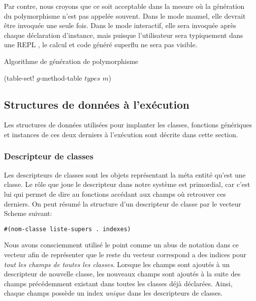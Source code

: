       Par contre, nous croyons que ce soit acceptable dans la mesure
      où la génération du polymorphisme n'est pas appelée
      souvent. Dans le mode manuel, elle devrait être invoquée une
      seule fois. Dans le mode interactif, elle sera invoquée après
      chaque déclaration d'instance, mais puisque l'utilisateur sera
      typiquement dans une \og REPL \fg, le calcul et code généré
      superflu ne sera pas visible. 

      \begin{algorithm}
        \caption{Algorithme de génération de polymorphisme}
        \label{algo-poly}
        \begin{algorithmic}
              \STATE (table-set! $g$-method-table $types$ $m$)
            \ENDFOR
          \ENDFOR
        \ENDFOR
        \end{algorithmic}
      \end{algorithm}
      

  \subsection{Structures de données à l'exécution}
    Les structures de données utilisées pour implanter les classes,
    fonctions génériques et instances de ces deux derniers à
    l'exécution sont décrite dans cette section.
  
    \subsubsection{Descripteur de classes}
      Les descripteurs de classes sont les objets représentant la méta
      entité qu'est une classe. Le rôle que joue le descripteur dans
      notre système est primordial, car c'est lui qui permet de dire
      au fonctions accédant aux champs où retrouver ces derniers. On
      peut résumé la structure d'un descripteur de classe par le
      vecteur Scheme suivant:

      \begin{lstlisting}
#(nom-classe liste-supers . indexes)
      \end{lstlisting}

      Nous avons consciemment utilisé le point comme un abus de
      notation dans ce vecteur afin de représenter que le reste du
      vecteur correspond a des indices pour \emph{tout les champs de
        toutes les classes}. Lorsque les champs sont ajoutés à un
      descripteur de nouvelle classe, les nouveaux champs sont ajoutés
      à la suite des champs précédemment existant dans toutes les
      classes déjà déclarées. Ainsi, chaque champs possède un index
      \emph{unique} dans les descripteurs de classes.

